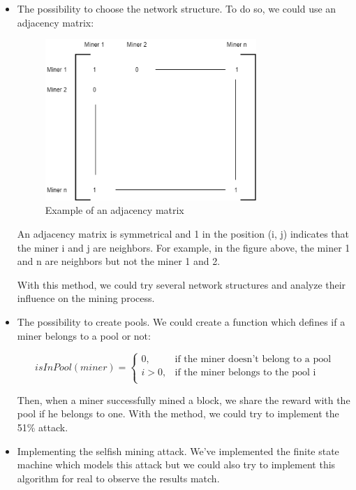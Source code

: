 \begin{itemize}
  \item The possibility to choose the network structure. To do so, we could use an adjacency matrix: \newline

  \begin{figure}[ht]
  \centering
  \includegraphics[width=8cm]{Figures/matrix}
  \caption{Example of an adjacency matrix}
  \end{figure}
  \medskip

  An adjacency matrix is symmetrical and 1 in the position (i, j) indicates that the miner i and j are neighbors. For example, in the figure above, the miner 1 and n are neighbors but not the miner 1 and 2. \newline

  With this method, we could try several network structures and analyze their influence on the mining process.

  \item The possibility to create pools. We could create a function which defines if a miner belongs to a pool or not: \newline

  \[
    isInPool(miner) =
    \begin{cases}
      0, & \text{if the miner doesn't belong to a pool}  \\
      i > 0, & \text{if the miner belongs to the pool i} \\
    \end{cases}
  \]
  \medskip

  Then, when a miner successfully mined a block, we share the reward with the pool if he belongs to one. With the method, we could try to implement the 51\% attack.

  \item Implementing the selfish mining attack. We've implemented the finite state machine which models this attack but we could also try to implement this algorithm for real to observe the results match.


\end{itemize}
